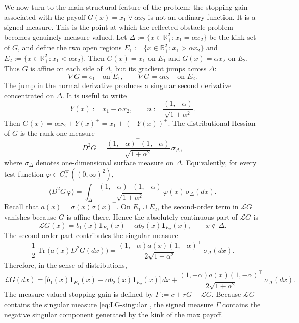 \documentclass[pdflatex,sn-mathphys-num]{sn-jnl}
\theoremstyle{plain}
\theoremstyle{definition}
\theoremstyle{remark}
\numberwithin{equation}{section}
\begin{document}
We now turn to the main structural feature of the problem: the stopping gain associated with the payoff 
$G(x)=x_1\vee \alpha x_2$ 
is not an ordinary function. It is a signed measure. This is the point at which the reflected obstacle problem becomes genuinely measure-valued. Let 
$\Delta:=\{x\in\mathbb R_+^2:x_1=\alpha x_2\}$ 
be the kink set of \(G\), and define the two open regions 
$E_1:=\{x\in\mathbb R_+^2:x_1>\alpha x_2\}$ and $E_2:=\{x\in\mathbb R_+^2:x_1<\alpha x_2\}$. 
Then 
$G(x)=x_1$ on $E_1$ and $G(x)=\alpha x_2$ on $E_2$. Thus \(G\) is affine on each side of \(\Delta\), but its gradient jumps across \(\Delta\): 
\[ 
\nabla G=e_1 \quad\text{on }E_1, \qquad \nabla G=\alpha e_2 \quad\text{on }E_2 . 
\]
The jump in the normal derivative produces a singular second derivative concentrated on \(\Delta\). It is useful to write 
\[ 
Y(x):=x_1-\alpha x_2, \qquad n:=\frac{(1,-\alpha)}{\sqrt{1+\alpha^2}} . 
\] 
Then 
$\displaystyle G(x)=\alpha x_2+Y(x)^+ = x_1+(-Y(x))^+$. 
The distributional Hessian of \(G\) is the rank-one measure 
\begin{equation} \label{eq:dist-hessian-G} 
D^2G = \frac{(1,-\alpha)^\top(1,-\alpha)} {\sqrt{1+\alpha^2}}\,\sigma_\Delta , 
\end{equation} 
where \(\sigma_\Delta\) denotes one-dimensional surface measure on \(\Delta\). Equivalently, for every test function \(\varphi\in C_c^\infty((0,\infty)^2)\), 
\[ 
\langle D^2G\,\varphi\rangle = \int_\Delta \frac{(1,-\alpha)^\top(1,-\alpha)} {\sqrt{1+\alpha^2}}\,\varphi(x)\,\sigma_\Delta(dx). 
\] 
Recall that 
$a(x)=\sigma(x)\sigma(x)^\top $. 
On \(E_1\cup E_2\), the second-order term in \(\mathcal LG\) vanishes because \(G\) is affine there. Hence the absolutely continuous part of \(\mathcal LG\) is 
\[
\mathcal LG(x) = b_1(x)\mathbf 1_{E_1}(x) + \alpha b_2(x)\mathbf 1_{E_2}(x), \qquad x\notin\Delta . 
\]
The second-order part contributes the singular measure 
\begin{equation} \label{eq:LG-singular} \frac12\operatorname{Tr}\big(a(x)D^2G(dx)\big) = \frac{ (1,-\alpha)a(x)(1,-\alpha)^\top } {2\sqrt{1+\alpha^2}}\,\sigma_\Delta(dx). 
\end{equation} 
Therefore, in the sense of distributions, 
\[
\mathcal LG(dx) = \Big[ b_1(x)\mathbf 1_{E_1}(x) + \alpha b_2(x)\mathbf 1_{E_2}(x) \Big]\,dx + \frac{ (1,-\alpha)a(x)(1,-\alpha)^\top } {2\sqrt{1+\alpha^2}}\,\sigma_\Delta(dx). 
\]
The measure-valued stopping gain is defined by 
$\displaystyle \Gamma:=c+rG-\mathcal LG $. 
Because \(\mathcal LG\) contains the singular measure \eqref{eq:LG-singular}, the signed measure \(\Gamma\) contains the negative singular component generated by the kink of the max payoff.
\end{document}
